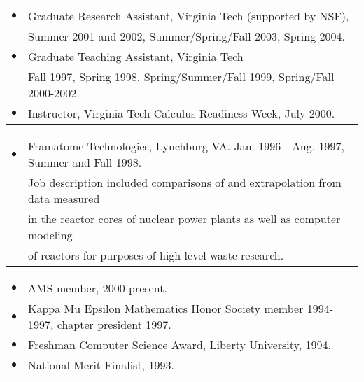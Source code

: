 \documentclass[10pt]{article}
\begin{document}

\begin{tabular}{ll}
$\bullet$&Graduate Research Assistant, Virginia Tech (supported by NSF),\\
& Summer 2001 and 2002, Summer/Spring/Fall 2003, Spring 2004.\\
$\bullet$&Graduate Teaching Assistant, Virginia Tech \\
&Fall 1997, Spring 1998, Spring/Summer/Fall 1999, Spring/Fall 2000-2002.\\
$\bullet$& Instructor, Virginia Tech Calculus Readiness Week, July 2000.\\
\end{tabular}
\newline


\begin{tabular}{ll}
$\bullet$&Framatome Technologies, Lynchburg VA. Jan. 1996 - Aug. 1997, Summer and Fall 1998.\\
&\text{ }\text{ }Job description included comparisons of and extrapolation from data measured\\
&in the reactor cores of nuclear power plants as well as computer modeling\\
&of reactors for purposes of high level waste research. 
\end{tabular}
\newline


\begin{tabular}{ll}
$\bullet$&AMS member, 2000-present.\\
$\bullet$&Kappa Mu Epsilon  Mathematics Honor Society member 1994-1997, chapter president 1997.\\
$\bullet$&Freshman Computer Science Award, Liberty University, 1994.\\
$\bullet$&National Merit Finalist, 1993.\\
\end{tabular}
\newline

\end{document}
